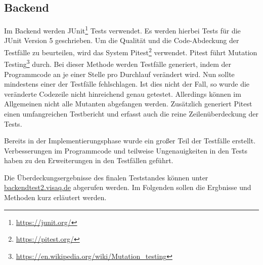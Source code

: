 \subsection{Backend}
Im Backend werden JUnit\footnote{\url{https://junit.org/}} Tests verwendet. Es werden hierbei Tests für die JUnit Version 5 geschrieben.
Um die Qualität und die Code-Abdeckung der Testfälle zu beurteilen, wird das System Pitest\footnote{\url{https://pitest.org/}} verwendet.
Pitest führt Mutation Testing\footnote{\url{https://en.wikipedia.org/wiki/Mutation_testing}} durch.
Bei dieser Methode werden Testfälle generiert, indem der Programmcode an je einer Stelle pro Durchlauf verändert wird.
Nun sollte mindestens einer der Testfälle fehlschlagen.
Ist dies nicht der Fall, so wurde die veränderte Codezeile nicht hinreichend genau getestet.
Allerdings können im Allgemeinen nicht alle Mutanten abgefangen werden.
Zusätzlich generiert Pitest einen umfangreichen Testbericht und erfasst auch die reine Zeilenüberdeckung der Tests.

Bereits in der Implementierungsphase wurde ein großer Teil der Testfälle erstellt.
Verbesserungen im Programmcode und teilweise Ungenauigkeiten in den Tests haben zu den Erweiterungen in den Testfällen geführt.

Die Überdeckungsergebnisse des finalen Teststandes können unter \url{backendtest2.visaq.de} abgerufen werden.
Im Folgenden sollen die Ergbnisse und Methoden kurz erläutert werden.


